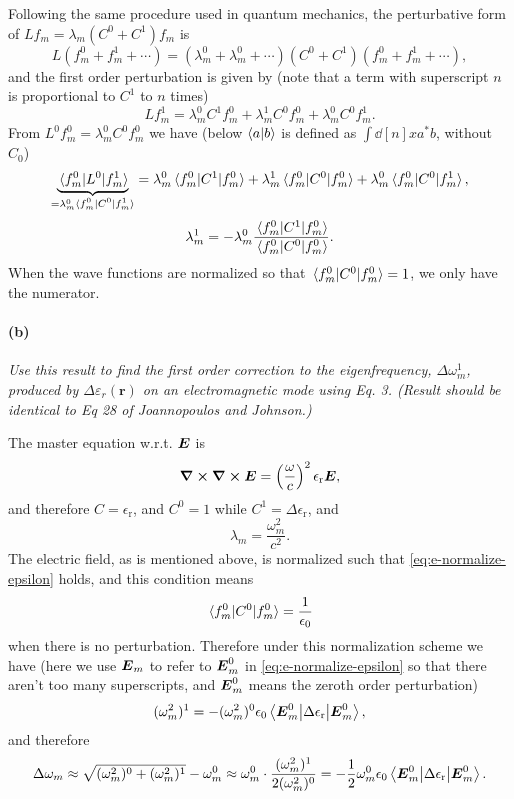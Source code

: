 \documentclass[hyperref, a4paper]{article}
\newcommand{\epsr}{\epsilon_{\text{r}}}
\begin{document}
Following the same procedure used in quantum mechanics,
the perturbative form of $L f_m = \lambda_m (C^0 + C^1) f_m$ is 
\begin{equation}
    L (f_m^0 + f_m^1 + \cdots)
    = (\lambda_m^0 + \lambda_m^0 + \cdots) (C^0 + C^1)
    (f_m^0 + f_m^1 + \cdots),
\end{equation}
and the first order perturbation is given by 
(note that a term with superscript $n$ is proportional to $C^1$ to $n$ times)
\begin{equation}
    L f_m^1 = \lambda_m^0 C^1 f_m^0 + \lambda_m^1 C^0 f_m^0 + \lambda_m^0 C^0 f_m^1.
\end{equation}
From $L^0 f_m^0 = \lambda_m^0 C^0 f_m^0$
we have (below $\braket{a}{b}$ is defined as $\int \dd[n]{x} a^* b$, without $C_0$)
\[
    \underbrace{\mel*{f_m^0}{L^0}{f_m^1}}_{= \lambda_m^0 \mel*{f_m^0}{C^0}{f_m^1} } 
    = \lambda_m^0 \mel*{f_m^0}{C^1}{f_m^0}
    + \lambda_m^1 \mel*{f_m^0}{C^0}{f_m^0} + \lambda_m^0 \mel*{f_m^0}{C^0}{f_m^1} ,
\]
\begin{equation}
    \lambda_m^1 = - \lambda_m^0 \frac{\mel*{f_m^0}{C^1}{f_m^0}}{\mel*{f_m^0}{C^0}{f_m^0}}.
\end{equation}
When the wave functions are normalized so that $\mel*{f_m^0}{C^0}{f_m^0} = 1$, 
we only have the numerator.

\paragraph*{(b)} \textit{Use this result to find the first order correction to the eigenfrequency, $\Delta \omega_m^1$, produced by $\Delta \varepsilon_r(\mathbf{r})$ on an electromagnetic mode using Eq. 3. (Result should be identical to Eq 28 of Joannopoulos and Johnson.)} 

The master equation w.r.t. $\vb*{E}$ is 
\begin{equation}
    \curl{\curl{\vb*{E}}} = \left(\frac{\omega}{c}\right)^2 \epsr \vb*{E}, 
\end{equation}
and therefore $C = \epsr$, and $C^0 = 1$ while $C^1 = \Delta \epsr$, and 
\[
    \lambda_m = \frac{\omega_m^2}{c^2}.
\]
The electric field, as is mentioned above, is normalized such that \eqref{eq:e-normalize-epsilon} holds, 
and this condition means 
\[
    \mel*{f_m^0}{C^0}{f_m^0} = \frac{1}{\epsilon_0}
\]
when there is no perturbation. Therefore under this normalization scheme we have 
(here we use $\vb*{E}_m$ to refer to $\vb*{E}_m^0$ in \eqref{eq:e-normalize-epsilon}
so that there aren't too many superscripts, 
and $\vb*{E}_m^0$ means the zeroth order perturbation)
\begin{equation}
    (\omega_m^2)^1 = - (\omega_m^2)^0 \epsilon_0 \mel{\vb*{E}_m^0}{\Delta \epsr}{\vb*{E}_m^0}, 
\end{equation}
and therefore 
\begin{equation}
    \Delta \omega_m \approx \sqrt{(\omega_m^2)^0 + (\omega_m^2)^1} - \omega_m^0
    \approx \omega_m^0 \cdot \frac{(\omega_m^2)^1}{2 (\omega_m^2)^0}
    = - \frac{1}{2} \omega_m^0 \epsilon_0  \mel{\vb*{E}_m^0}{\Delta \epsr}{\vb*{E}_m^0}.
\end{equation}
\end{document}
